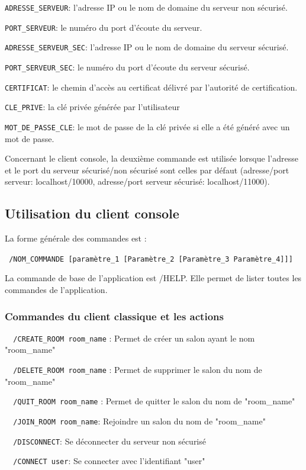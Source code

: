 \documentclass[a4paper,11pt,french]{book}
\begin{document}
\verb+ADRESSE_SERVEUR+: l'adresse IP ou le nom de domaine du serveur non sécurisé.

\verb+PORT_SERVEUR+: le numéro du port d'écoute du serveur.

\verb+ADRESSE_SERVEUR_SEC+: l'adresse IP ou le nom de domaine du serveur sécurisé.

\verb+PORT_SERVEUR_SEC+: le numéro du port d'écoute du serveur sécurisé.

\verb+CERTIFICAT+: le chemin d'accès au certificat délivré par l'autorité de certification.

\verb+CLE_PRIVE+: la clé privée générée par l'utilisateur

\verb+MOT_DE_PASSE_CLE+: le mot de passe de la clé privée si elle a été généré avec un mot de passe.

	Concernant le client console, la deuxième commande est utilisée lorsque l'adresse et le port du serveur sécurisé/non sécurisé sont celles par défaut (adresse/port serveur: localhost/10000, adresse/port serveur sécurisé: localhost/11000).
	
\subsection{Utilisation du client console}
	
	La forme générale des commandes est : 
	
\verb+ /NOM_COMMANDE [paramètre_1 [Paramètre_2 [Paramètre_3 Paramètre_4]]]+

La commande de base de l'application est /HELP. Elle permet de lister toutes les commandes de l'application.
\subsubsection{Commandes du client classique et les actions}

\verb+	/CREATE_ROOM room_name+  : Permet de créer un salon ayant le nom "room\_name"

\verb+	/DELETE_ROOM room_name+ :  Permet de supprimer le salon du nom de "room\_name"

\verb+	/QUIT_ROOM room_name+ :  Permet de quitter le salon du nom de "room\_name"

\verb+	/JOIN_ROOM room_name+:  Rejoindre un salon du nom de "room\_name"

\verb+	/DISCONNECT+: Se déconnecter du serveur non sécurisé

\verb+	/CONNECT user+:  Se connecter avec l'identifiant "user"
\end{document}
